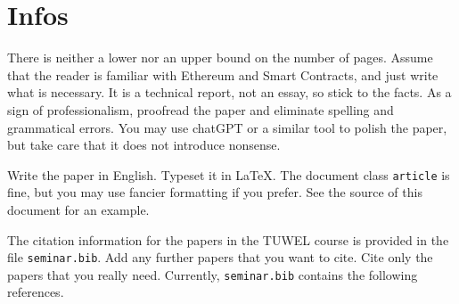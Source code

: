 \documentclass{article}
\begin{document}
\section{Infos}
There is neither a lower nor an upper bound on the number of pages. Assume that
the reader is familiar with Ethereum and Smart Contracts, and just write what
is necessary. It is a technical report, not an essay, so stick to the facts. As
a sign of professionalism, proofread the paper and eliminate spelling and
grammatical errors. You may use chatGPT or a similar tool to polish the paper,
but take care that it does not introduce nonsense.

Write the paper in English. Typeset it in \LaTeX. The document class
\verb"article" is fine, but you may use fancier formatting if you prefer. See
the source of this document for an example.

The citation information for the papers in the TUWEL course is provided
in the file \verb"seminar.bib". Add any further papers that you want to cite.
Cite only the papers that you really need.
Currently, \verb"seminar.bib" contains the following references.
\nocite{*}


\end{document}
